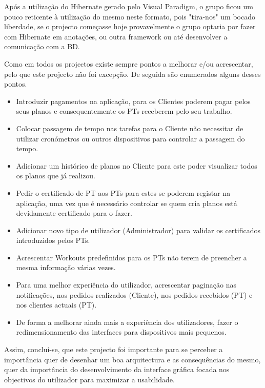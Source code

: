 \hspace{5mm} Após a utilização do Hibernate gerado pelo Visual Paradigm, o grupo ficou um pouco reticente à utilização do mesmo neste formato, pois "tira-nos" um bocado liberdade, se o projecto começasse hoje provavelmente o grupo optaria por fazer com Hibernate em anotações, ou outra framework ou até desenvolver a comunicação com a BD.

\hspace{5mm} Como em todos os projectos existe sempre pontos a melhorar e/ou acrescentar, pelo que este projecto não foi excepção. De seguida são enumerados alguns desses pontos.

\begin{itemize}
    \item Introduzir pagamentos na aplicação, para os Clientes poderem pagar pelos seus planos e consequentemente os PTs receberem pelo seu trabalho.
    
    \item Colocar passagem de tempo nas tarefas para o Cliente não necessitar de utilizar cronómetros ou outros dispositivos para controlar a passagem do tempo.
    
    \item Adicionar um histórico de planos no Cliente para este poder visualizar todos os planos que já realizou.
    
    \item Pedir o certificado de PT aos PTs para estes se poderem registar na aplicação, uma vez que é necessário controlar se quem cria planos está devidamente certificado para o fazer.

    \item Adicionar novo tipo de utilizador (Administrador) para validar os certificados introduzidos pelos PTs.
    
    \item Acrescentar Workouts predefinidos para os PTs não terem de preencher a mesma informação várias vezes.
    
    \item Para uma melhor experiência do utilizador, acrescentar paginação nas notificações, nos pedidos realizados (Cliente), nos pedidos recebidos (PT) e nos clientes actuais (PT).
    
    \item De forma a melhorar ainda mais a experiência dos utilizadores, fazer o redimensionamento das interfaces para dispositivos mais pequenos. 
    
\end{itemize}

\hspace{5mm} Assim, conclui-se, que este projecto foi importante para se perceber a importância quer de desenhar um boa arquitectura e as consequências do mesmo, quer da importância do desenvolvimento da interface gráfica focada nos objectivos do utilizador para maximizar a usabilidade. 